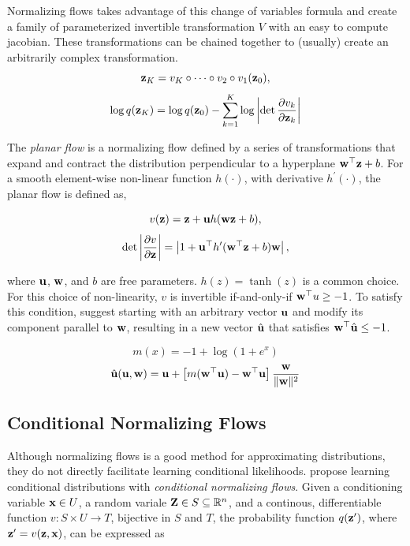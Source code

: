 \documentclass[twoside]{article}
\begin{document}
Normalizing flows takes advantage of this change of variables formula and create
a family of parameterized invertible transformation \(V\) with an easy to
compute jacobian. These transformations can be chained together to (usually)
create an arbitrarily complex transformation.
\begin{equation}
  \textbf{z}_K = v_K \circ \dots \circ v_2 \circ v_1(\textbf{z}_0),
\end{equation}
\begin{equation}
  \log q(\textbf{z}_K) = \log q(\textbf{z}_0) - \sum_{k=1}^K{\log \left\lvert \det
  \frac{\partial v_k}{\partial \textbf{z}_k} \right\rvert}
\end{equation}

The \emph{planar flow} is a normalizing flow defined by a series of
transformations that expand and contract the distribution perpendicular to a
hyperplane \(\mathbf{w}^\top \textbf{z}  + b\). For a smooth element-wise non-linear
function \(h(\cdot)\), with derivative \(h^\prime(\cdot)\), the planar flow is
defined as,

\begin{equation}
  v(\textbf{z}) = \textbf{z} + \mathbf{u} h(\mathbf{w} \textbf{z} + b),
\end{equation}
\begin{equation}
  \det \left\lvert \frac{\partial v}{\partial \textbf{z}} \right\rvert =
  \left\lvert 1 + \mathbf{u}^\top h^\prime(\mathbf{w}^\top \textbf{z} + b) \mathbf{w} \right\rvert,
\end{equation}

\noindent
where \(\mathbf{u}\), \(\mathbf{w}\), and \(b\) are free parameters.
\(h(z) = \tanh(z)\) is a common choice. For this choice of non-linearity,
\(v\) is invertible if-and-only-if \(\mathbf{w}^\top u \geq -1\). To satisfy this
condition, \citet{rezende15} suggest starting with an arbitrary vector
\(\mathbf{u}\) and modify its component parallel to \(\mathbf{w}\), resulting in a new
vector \(\hat{\mathbf{u}}\) that satisfies \(\mathbf{w}^\top \hat{\mathbf{u}} \leq -1\).

\begin{equation*}
  m(x) = -1 + \log{(1 + e^x)}
\end{equation*}
\begin{equation}
  \hat{\mathbf{u}}(\mathbf{u}, \mathbf{w}) = \mathbf{u} + \left[m(\mathbf{w}^\top \mathbf{u}) -
    \mathbf{w}^\top \mathbf{u} \right] \frac{\mathbf{w}}{\lVert\mathbf{w}\rVert^2}
\end{equation}

\subsection{Conditional Normalizing Flows} \label{sec:cnf}
Although normalizing flows is a good method for approximating distributions,
they do not directly facilitate learning conditional likelihoods.
\citet{winkler19} propose learning conditional distributions with
\emph{conditional normalizing flows}. Given a conditioning variable
\(\textbf{x} \in U\), a random variale \(\textbf{Z} \in S \subseteq \mathbb{R}^n\), and a continous,
differentiable function \(v : S \times U \rightarrow T\), bijective in \(S\) and
\(T\), the probability function \(q(\textbf{z}^\prime)\), where
\(\textbf{z}^\prime = v(\textbf{z}, \textbf{x})\), can be expressed as
\end{document}
